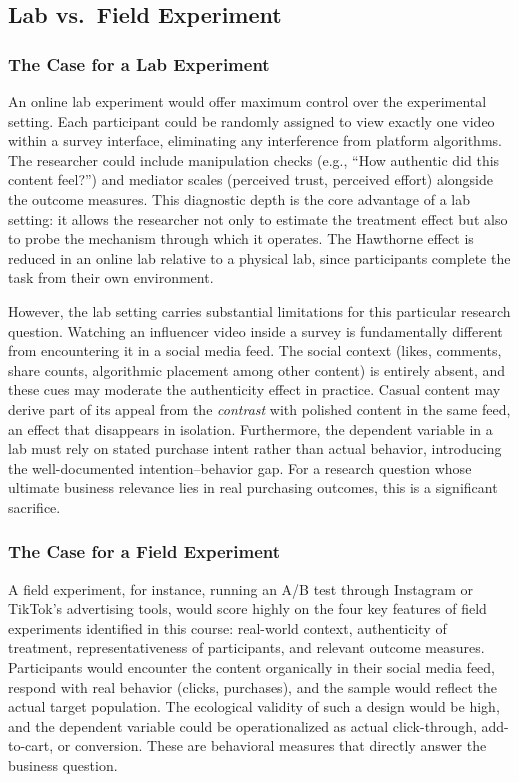 \documentclass[10pt]{article}
\begin{document}
\subsection{Lab vs.\ Field Experiment}

\subsubsection{The Case for a Lab Experiment}

An online lab experiment would offer maximum control over the experimental setting. Each participant could be randomly assigned to view exactly one video within a survey interface, eliminating any interference from platform algorithms. The researcher could include manipulation checks (e.g., ``How authentic did this content feel?'') and mediator scales (perceived trust, perceived effort) alongside the outcome measures. This diagnostic depth is the core advantage of a lab setting: it allows the researcher not only to estimate the treatment effect but also to probe the mechanism through which it operates. The Hawthorne effect is reduced in an online lab relative to a physical lab, since participants complete the task from their own environment.

However, the lab setting carries substantial limitations for this particular research question. Watching an influencer video inside a survey is fundamentally different from encountering it in a social media feed. The social context (likes, comments, share counts, algorithmic placement among other content) is entirely absent, and these cues may moderate the authenticity effect in practice. Casual content may derive part of its appeal from the \textit{contrast} with polished content in the same feed, an effect that disappears in isolation. Furthermore, the dependent variable in a lab must rely on stated purchase intent rather than actual behavior, introducing the well-documented intention--behavior gap. For a research question whose ultimate business relevance lies in real purchasing outcomes, this is a significant sacrifice.

\subsubsection{The Case for a Field Experiment}

A field experiment, for instance, running an A/B test through Instagram or TikTok's advertising tools, would score highly on the four key features of field experiments identified in this course: real-world context, authenticity of treatment, representativeness of participants, and relevant outcome measures. Participants would encounter the content organically in their social media feed, respond with real behavior (clicks, purchases), and the sample would reflect the actual target population. The ecological validity of such a design would be high, and the dependent variable could be operationalized as actual click-through, add-to-cart, or conversion. These are behavioral measures that directly answer the business question.
\end{document}
